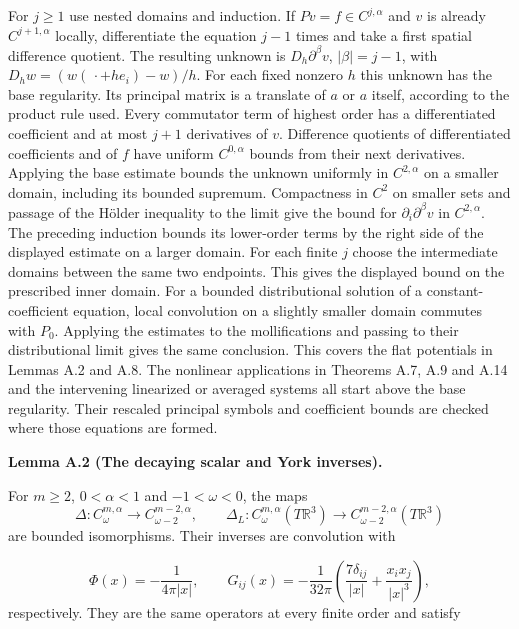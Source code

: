\documentclass[
  english,
  11pt,
  reqno]{amsart}
\makeatletter
\newcommand{\pandocstatementheading}[1]{%
  \par\addpenalty{\@beginparpenalty}%
  \addvspace{.5\baselineskip plus .2\baselineskip minus .2\baselineskip}%
  {\normalfont\bfseries #1\par}%
  \nobreak\@afterindenttrue\@afterheading
}
\makeatother
\begin{document}
For \(j\ge1\) use nested domains and induction. If
\(Pv=f\in C^{j,\alpha}\) and \(v\) is already \(C^{j+1,\alpha}\)
locally, differentiate the equation \(j-1\) times and take a first
spatial difference quotient. The resulting unknown is
\(D_h\partial^\beta v\), \(|\beta|=j-1\), with
\(D_h w=(w(\,\cdot+h e_i)-w)/h\). For each fixed nonzero \(h\) this
unknown has the base regularity. Its principal matrix is a translate of
\(a\) or \(a\) itself, according to the product rule used. Every
commutator term of highest order has a differentiated coefficient and at
most \(j+1\) derivatives of \(v\). Difference quotients of
differentiated coefficients and of \(f\) have uniform \(C^{0,\alpha}\)
bounds from their next derivatives. Applying the base estimate bounds
the unknown uniformly in \(C^{2,\alpha}\) on a smaller domain, including
its bounded supremum. Compactness in \(C^2\) on smaller sets and passage
of the Hölder inequality to the limit give the bound for
\(\partial_i\partial^\beta v\) in \(C^{2,\alpha}\). The preceding
induction bounds its lower-order terms by the right side of the
displayed estimate on a larger domain. For each finite \(j\) choose the
intermediate domains between the same two endpoints. This gives the
displayed bound on the prescribed inner domain. For a bounded
distributional solution of a constant-coefficient equation, local
convolution on a slightly smaller domain commutes with \(P_0\). Applying
the estimates to the mollifications and passing to their distributional
limit gives the same conclusion. This covers the flat potentials in
Lemmas A.2 and A.8. The nonlinear applications in Theorems A.7, A.9 and
A.14 and the intervening linearized or averaged systems all start above
the base regularity. Their rescaled principal symbols and coefficient
bounds are checked where those equations are formed.

\pandocstatementheading{\leavevmode{}\label{lem:online-chart-decaying-flat-inverses}Lemma A.2 (The decaying scalar and York inverses).}

For \(m\ge2\), \(0<\alpha<1\) and \(-1<\omega<0\), the maps \[
\Delta:C^{m,\alpha}_\omega
\longrightarrow C^{m-2,\alpha}_{\omega-2},
\qquad
\Delta_L:C^{m,\alpha}_\omega(T\mathbb R^3)
\longrightarrow C^{m-2,\alpha}_{\omega-2}(T\mathbb R^3)
\] are bounded isomorphisms. Their inverses are convolution with

\label{eq:online-chart-decaying-green-kernels} \[
\Phi(x)=-\frac1{4\pi|x|},
\qquad
G_{ij}(x)=-\frac1{32\pi}
\left(\frac{7\delta_{ij}}{|x|}
+\frac{x_ix_j}{|x|^3}\right),
\] respectively. They are the same operators at every finite order and
satisfy
\end{document}
